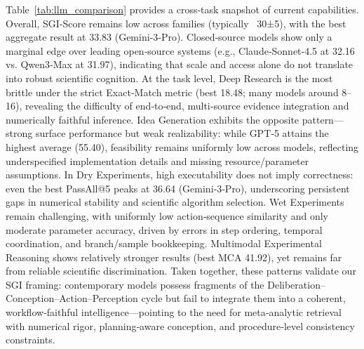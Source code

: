 Table~\ref{tab:llm_comparison} provides a cross‑task snapshot of current capabilities. Overall, SGI‑Score remains low across families (typically ~30±5), with the best aggregate result at 33.83 (Gemini‑3‑Pro). Closed‑source models show only a marginal edge over leading open‑source systems (e.g., Claude‑Sonnet‑4.5 at 32.16 vs. Qwen3‑Max at 31.97), indicating that scale and access alone do not translate into robust scientific cognition. At the task level, Deep Research is the most brittle under the strict Exact‑Match metric (best 18.48; many models around 8–16), revealing the difficulty of end‑to‑end, multi‑source evidence integration and numerically faithful inference. Idea Generation exhibits the opposite pattern—strong surface performance but weak realizability: while GPT‑5 attains the highest average (55.40), feasibility remains uniformly low across models, reflecting underspecified implementation details and missing resource/parameter assumptions. In Dry Experiments, high executability does not imply correctness: even the best PassAll@5 peaks at 36.64 (Gemini‑3‑Pro), underscoring persistent gaps in numerical stability and scientific algorithm selection. Wet Experiments remain challenging, with uniformly low action‑sequence similarity and only moderate parameter accuracy, driven by errors in step ordering, temporal coordination, and branch/sample bookkeeping. Multimodal Experimental Reasoning shows relatively stronger results (best MCA 41.92), yet remains far from reliable scientific discrimination. Taken together, these patterns validate our SGI framing: contemporary models possess fragments of the Deliberation–Conception–Action–Perception cycle but fail to integrate them into a coherent, workflow‑faithful intelligence—pointing to the need for meta‑analytic retrieval with numerical rigor, planning‑aware conception, and procedure‑level consistency constraints.

